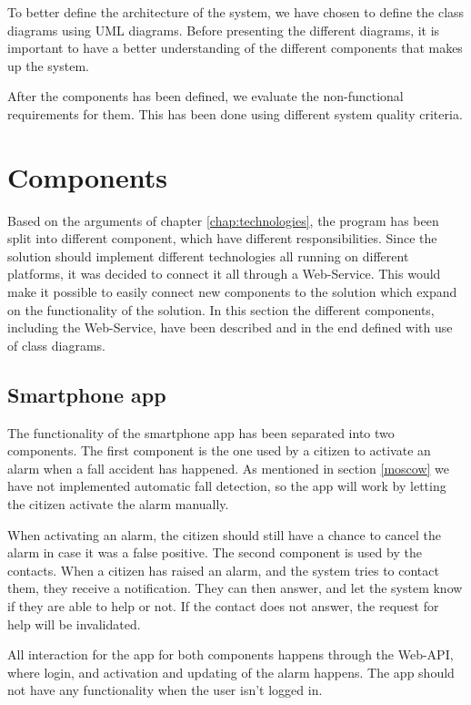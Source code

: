 \label{chap:system-arch}
To better define the architecture of the system, we have chosen to define the class diagrams using UML diagrams. Before presenting the different diagrams, it is important to have a better understanding of the different components that makes up the system. 

After the components has been defined, we evaluate the non-functional requirements for them. This has been done using different system quality criteria.

\section{Components}
Based on the arguments of chapter \ref{chap:technologies}, the program has been split into different component, which have different responsibilities. Since the solution should implement different technologies all running on different platforms, it was decided to connect it all through a Web-Service. This would make it possible to easily connect new components to the solution which expand on the functionality of the solution. In this section the different components, including the Web-Service, have been described and in the end defined with use of class diagrams.

\subsection{Smartphone app}

The functionality of the smartphone app has been separated into two components. The first component is the one used by a citizen to activate an alarm when a fall accident has happened. As mentioned in section \ref{moscow} we have not implemented automatic fall detection, so the app will work by letting the citizen activate the alarm manually. 

When activating an alarm, the citizen should still have a chance to cancel the alarm in case it was a false positive. The second component is used by the contacts. When a citizen has raised an alarm, and the system tries to contact them, they receive a notification. They can then answer, and let the system know if they are able to help or not. If the contact does not answer, the request for help will be invalidated.

All interaction for the app for both components happens through the Web-API, where login, and activation and updating of the alarm happens. The app should not have any functionality when the user isn't logged in.

